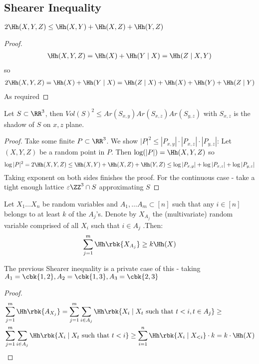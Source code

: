 \documentclass[a4paper, 11pt, oneside]{book}
\begin{document}
\subsection{Shearer Inequality}
\begin{thm}
	[Shearer] $2\Hh(X,Y,Z) \le \Hh(X,Y) + \Hh(X,Z) + \Hh(Y,Z)$
\end{thm}
\begin{proof}
	\begin{align*}
	\Hh(X,Y,Z) = \Hh(X) + \Hh(Y\mid X) = \Hh(Z\mid X,Y)	
	\end{align*}
	so
		\begin{align*}
	2\Hh(X,Y,Z) = \Hh(X) + \Hh(Y\mid X) = \Hh(Z\mid X) + \Hh(X) + \Hh(Y) + \Hh(Z\mid Y)	
	\end{align*}	
	As required
\end{proof}
\begin{cor}
Let $S\subset \RR^3$, then $Vol(S)^2\le 	Ar(S_{x,y})Ar(S_{x,z})Ar(S_{y,z})$ with $S_{x,z}$ is the shadow of $S$ on $x,z$ plane.
\end{cor}
\begin{proof}
	Take some finite $P \subset \RR^3$. We show $|P|^2 \le |P_{x,y}|\cdot|P_{x,z}|\cdot|P_{y,z}|$: Let $(X,Y,Z)$ be a random point in $P$. Then
	$\log(|P|) = \Hh(X,Y,Z)$ so
	 $$\log|P|^2 = 2\Hh(X,Y,Z) \le \Hh(X,Y) + \Hh(X,Z) + \Hh(Y,Z) \le \log|P_{x,y}| + \log|P_{x,z}| +\log|P_{y,z}|$$
	 Taking exponent on both sides finishes the proof. For the continuous case - take a tight enough lattice $\varepsilon\ZZ^3\cap S$ approximating $S$ 
\end{proof}
\begin{thm}
	\label{thm: Shearer General}
	Let $X_1\ldots X_n$ be random variables and $A_1,\ldots A_m\subset[n]$ such that any $i\in [n]$ belongs to at least $k$ of the $A_j$'s. Denote by $X_{A_j}$ the (multivariate) random variable comprised of all $X_i$ such that $i\in A_j$ .Then:
	\[
	\sum_{j=1}^m \Hh\rbk{X_{A_j}} \ge k\Hh(X)
	\]
\end{thm}
\begin{remark}
	The previous Shearer inequality is a private case of this - taking $A_1 = \cbk{1,2}, A_2 =\cbk{1,3}, A_3 = \cbk{2,3}$
\end{remark}
\begin{proof}
	\begin{align*}
		&\sum_{j=1}^m \Hh\rbk{A_{X_j}} = \sum_{j=1}^m\sum_{i\in A_j} \Hh\rbk{X_i\mid X_t\text{ such that }t<i, t\in A_j} \ge \\
		&\sum_{j=1}^m\sum_{i\in A_j} \Hh\rbk{X_i\mid X_t\text{ such that }t<i}  \ge \sum_{i=1}^n \Hh\rbk{X_i \mid X_{<i}}\cdot k
 = k \cdot \Hh(X)	\end{align*}
\end{proof}
\end{document}
